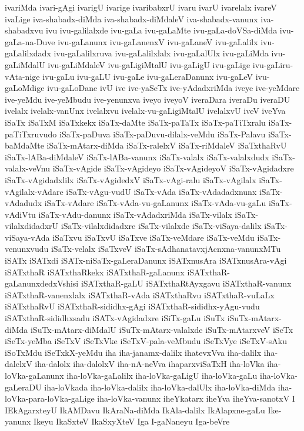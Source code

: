 {ivariMda
ivari-gAgi
ivarigU
ivarige
ivaribabxrU
ivaru
ivarU
ivarelalx
ivareV
ivaLige
iva-shabadx-diMda
iva-shabadx-diMdaleV
iva-shabadx-vanunx
iva-shabadxvu
ivu
ivu-galilalxde
ivu-gaLa
ivu-gaLaMte
ivu-gaLa-doVSa-diMda
ivu-gaLa-na-Duve
ivu-gaLanunx
ivu-gaLanenxV
ivu-gaLaneV
ivu-gaLalilx
ivu-gaLalilxdadx
ivu-gaLalilxruva
ivu-gaLalilxlalx
ivu-gaLalUlx
ivu-gaLiMda
ivu-gaLiMdalU
ivu-gaLiMdaleV
ivu-gaLigiMtalU
ivu-gaLigU
ivu-gaLige
ivu-gaLiru-vAta-nige
ivu-gaLu
ivu-gaLU
ivu-gaLe
ivu-gaLeraDanunx
ivu-gaLeV
ivu-gaLoMdige
ivu-gaLoDane
ivU
ive
ive-yaSeTx
ive-yAdadxriMda
iveye
ive-yeMdare
ive-yeMdu
ive-yeMbudu
ive-yenunxva
iveyo
iveyoV
iveraDara
iveraDu
iveraDU
ivelalx
ivelalx-vanUnx
ivelalxvu
ivelalx-vu-gaLigiMtalU
ivelalxvU
iveV
iveYva
iSaTx
iSaTxM
iSaTxkekx
iSaTx-daMte
iSaTx-paTaTx
iSaTx-paTiTxralu
iSaTx-paTiTxruvudo
iSaTx-paDuva
iSaTx-paDuvu-dilalx-veMdu
iSaTx-Palavu
iSaTx-baMdaMte
iSaTx-mAtarx-diMda
iSaTx-ralelxV
iSaTx-riMdaleV
iSaTxthaRvU
iSaTx-lABa-diMdaleV
iSaTx-lABa-vanunx
iSaTx-valalx
iSaTx-valalxdudx
iSaTx-valalx-veVnu
iSaTx-vAgide
iSaTx-vAgideyo
iSaTx-vAgideyoV
iSaTx-vAgidadxre
iSaTx-vAgidadxlilx
iSaTx-vAgidedxV
iSaTx-vAgi-ralu
iSaTx-vAgilalx
iSaTx-vAgilalx-vAdare
iSaTx-vAgu-vudU
iSaTx-vAda
iSaTx-vAdadadxnunx
iSaTx-vAdadudx
iSaTx-vAdare
iSaTx-vAda-vu-gaLanunx
iSaTx-vAda-vu-gaLu
iSaTx-vAdiVtu
iSaTx-vAdu-danunx
iSaTx-vAdadxriMda
iSaTx-vilalx
iSaTx-vilalxdidadxrU
iSaTx-vilalxdidadxre
iSaTx-vilalxde
iSaTx-viSaya-dalilx
iSaTx-viSaya-vAda
iSaTxvu
iSaTxvU
iSaTxve
iSaTx-veMdare
iSaTx-veMdu
iSaTx-venunxvudu
iSaTx-velalx
iSaTxveV
iSaTx-sAdhanatavxjAcnxna-vanunxMTu
iSATx
iSATxdi
iSATx-niSaTx-gaLeraDanunx
iSATxnusAra
iSATxnusAra-vAgi
iSATxthaR
iSATxthaRkekx
iSATxthaR-gaLanunx
iSATxthaR-gaLanunxdedxVshisi
iSATxthaR-gaLU
iSATxthaRtAyxgavu
iSATxthaR-vanunx
iSATxthaR-vanenxlalx
iSATxthaR-vAda
iSATxthaRvu
iSATxthaR-vuLaLx
iSATxthaRvU
iSATxthaR-sididhx-gAgi
iSATxthaR-sididhx-yAgu-vudu
iSATxthaR-sididhxsadu
iSATx-vAgidadxre
iSiTx-gaLu
iSuTx
iSuTx-mAtarx-diMda
iSuTx-mAtarx-diMdalU
iSuTx-mAtarx-valalxde
iSuTx-mAtarxveV
iSeTx
iSeTx-yeMba
iSeTxV
iSeTxVke
iSeTxV-pala-veMbudu
iSeTxVye
iSeTxV-sAku
iSoTxMdu
iSeTxkX-yeMdu
iha
iha-janamx-dalilx
ihatevxVva
iha-dalilx
iha-dalelxV
iha-dalolx
iha-dalolxV
iha-nA-neVva
ihaparxviSaTxH
iha-loVka
iha-loVka-gaLanunx
iha-loVka-gaLalilx
iha-loVka-gaLigU
iha-loVka-gaLu
iha-loVka-gaLeraDU
iha-loVkada
iha-loVka-dalilx
iha-loVka-dalUlx
iha-loVka-diMda
iha-loVka-para-loVka-gaLige
iha-loVka-vanunx
iheYkatarx
iheYva
iheYva-sanotxV
I
IEkAgarxteyU
IkAMDavu
IkAraNa-diMda
IkAla-dalilx
IkAlapxne-gaLu
Ike-yanunx
Ikeyu
IkaSxteV
IkaSxyXteV
Iga
I-gaNaneyu
Iga-beVre
}
